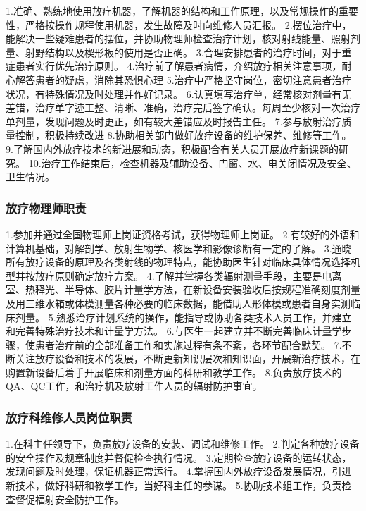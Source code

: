 1.准确、熟练地使用放疗机器，了解机器的结构和工作原理，以及常规操作的重要性，严格按操作规程使用机器，发生故障及时向维修人员汇报。
2.摆位治疗中，能解决一些疑难患者的摆位，并协助物理师检查治疗计划，核对射线能量、照射剂量、射野结构以及楔形板的使用是否正确。
3.合理安排患者的治疗时间，对于重症患者实行优先治疗原则。
4.治疗前了解患者病情，介绍放疗相关注意事项，耐心解答患者的疑虑，消除其恐惧心理
5.治疗中严格坚守岗位，密切注意患者治疗状况，有特殊情况及时处理并作好记录。
6.认真填写治疗单，经常核对剂量有无差错，治疗单字迹工整、清晰、准确，治疗完后签字确认。每周至少核对一次治疗单剂量，发现问题及时更正，如有较大差错应及时报告主任。
7.参与放射治疗质量控制，积极持续改进
8.协助相关部门做好放疗设备的维护保养、维修等工作。
9.了解国内外放疗技术的新进展和动态，积极配合有关人员开展放疗新课题的研究。
10.治疗工作结束后，检查机器及辅助设备、门窗、水、电关闭情况及安全、卫生情况。

\subsubsection{放疗物理师职责}

1.参加并通过全国物理师上岗证资格考试，获得物理师上岗证。
2.有较好的外语和计算机基础，对解剖学、放射生物学、核医学和影像诊断有一定的了解。
3.通晓所有放疗设备的原理及各类射线的物理特点，能协助医生针对临床具体情况选择机型并按放疗原则确定放疗方案。
4.了解并掌握各类辐射测量手段，主要是电离室、热释光、半导体、胶片计量学方法，在新设备安装验收后按规程准确刻度剂量及用三维水箱或体模测量各种必要的临床数据，能借助人形体模或患者自身实测临床剂量。
5.熟悉治疗计划系统的操作，能指导或协助各类技术人员工作，并建立和完善特殊治疗技术和计量学方法。
6.与医生一起建立并不断完善临床计量学步骤，使患者治疗前的全部准备工作和实施过程有条不紊，各环节配合默契。
7.不断关注放疗设备和技术的发展，不断更新知识层次和知识面，开展新治疗技术，在购置新设备后着手开展临床和剂量方面的科研和教学工作。
8.负责放疗技术的QA、QC工作，和治疗机及放射工作人员的辐射防护事宜。

\subsubsection{放疗科维修人员岗位职责}

1.在科主任领导下，负责放疗设备的安装、调试和维修工作。
2.判定各种放疗设备的安全操作及规章制度并督促检查执行情况。
3.定期检查放疗设备的运转状态，发现问题及时处理，保证机器正常运行。
4.掌握国内外放疗设备发展情况，引进新技术，做好科研和教学工作，当好科主任的参谋。
5.协助技术组工作，负责检查督促福射安全防护工作。

